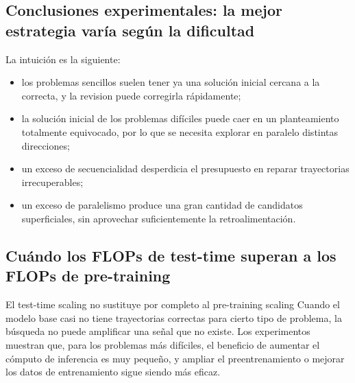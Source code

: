\documentclass[a4paper]{article}
\begin{document}
\subsection{Conclusiones experimentales: la mejor estrategia varía según la dificultad}



La intuición es la siguiente:

\begin{itemize}
    \item los problemas sencillos suelen tener ya una solución inicial cercana a la correcta, y la revision puede corregirla rápidamente;
    \item la solución inicial de los problemas difíciles puede caer en un planteamiento totalmente equivocado, por lo que se necesita explorar en paralelo distintas direcciones;
    \item un exceso de secuencialidad desperdicia el presupuesto en reparar trayectorias irrecuperables;
    \item un exceso de paralelismo produce una gran cantidad de candidatos superficiales, sin aprovechar suficientemente la retroalimentación.
\end{itemize}

\subsection{Cuándo los FLOPs de test-time superan a los FLOPs de pre-training}


\begin{importantbox}{El test-time scaling no sustituye por completo al pre-training scaling}
Cuando el modelo base casi no tiene trayectorias correctas para cierto tipo de problema, la búsqueda no puede amplificar una señal que no existe. Los experimentos muestran que, para los problemas más difíciles, el beneficio de aumentar el cómputo de inferencia es muy pequeño, y ampliar el preentrenamiento o mejorar los datos de entrenamiento sigue siendo más eficaz.
\end{importantbox}
\end{document}
